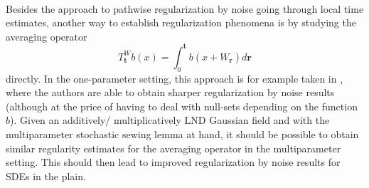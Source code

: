 \documentclass[11pt,oneside,english,reqno]{amsart}
\numberwithin{equation}{section}
\numberwithin{figure}{section}
\theoremstyle{plain}
\theoremstyle{definition}
\theoremstyle{remark}
\theoremstyle{plain}
\theoremstyle{plain}
\theoremstyle{plain}
\theoremstyle{plain}
\theoremstyle{plain}
\newcommand{\br}{\mathbf{r}}
\newcommand{\bt}{\mathbf{t}}
\begin{document}
\\
Besides the approach to pathwise regularization by noise going through local time estimates, another way to establish regularization phenomena is by studying the averaging operator 
\[
T^W_\bt b(x)=\int_0^\bt b(x+W_\br)d\br 
\]
directly. In the one-parameter setting, this approach is for example taken in \cite{galeati2020noiseless}, where the authors are able to obtain sharper regularization by noise results (although at the price of having to deal with null-sets depending on the function $b$). Given an additively/ multiplicatively LND Gaussian field and with the multiparameter stochastic sewing lemma at hand, it should be possible to obtain similar regularity estimates for the averaging operator in the multiparameter setting. This should then lead to improved regularization by noise results for SDEs in the plain. 





\end{document}
